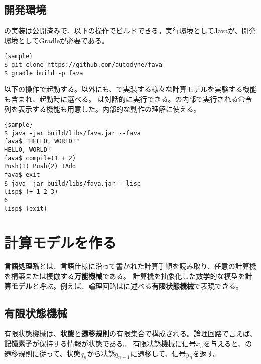 \documentclass[10pt,a4paper]{book}
\begin{document}
\section{開発環境}

\fava{}の実装は公開済みで、以下の操作でビルドできる。実行環境としてJavaが、開発環境としてGradleが必要である。

\begin{Verbatim}{sample}
$ git clone https://github.com/autodyne/fava
$ gradle build -p fava
\end{Verbatim}

以下の操作で起動する。\fava{}以外にも、で実装する様々な計算モデルを実験する機能も含まれ、起動時に選べる。
\fava{}は対話的に実行できる。\fava{}の内部で実行される命令列を表示する機能も用意した。内部的な動作の理解に使える。

\begin{Verbatim}{sample}
$ java -jar build/libs/fava.jar --fava
fava$ "HELLO, WORLD!"
HELLO, WORLD!
fava$ compile(1 + 2)
Push(1) Push(2) IAdd
fava$ exit
$ java -jar build/libs/fava.jar --lisp
lisp$ (+ 1 2 3)
6
lisp$ (exit)
\end{Verbatim}

\chapter{計算モデルを作る\label{chap:automata}}

\textbf{言語処理系}とは、言語仕様に沿って書かれた計算手順を読み取り、任意の計算機を構築または模倣する\textbf{万能機械}である。
計算機を抽象化した数学的な模型を\textbf{計算モデル}と呼ぶ。例えば、論理回路はに述べる\textbf{有限状態機械}で表現できる。

\section{有限状態機械\label{sect:regex}}

有限状態機械は、\textbf{状態}と\textbf{遷移規則}の有限集合で構成される。論理回路で言えば、\textbf{記憶素子}が保持する情報が状態である。
有限状態機械に信号$x_n$を与えると、の遷移規則に従って、状態$q_n$から状態$q_{n+1}$に遷移して、信号$y_n$を返す。
\end{document}
